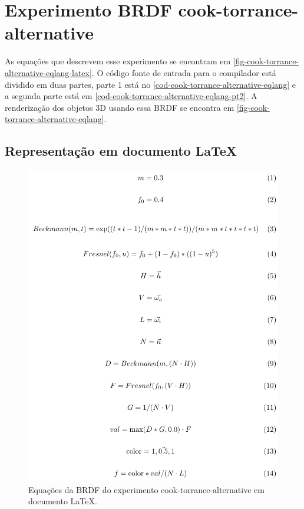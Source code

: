 \section{Experimento BRDF cook-torrance-alternative}

As equações que descrevem esse experimento se encontram em \autoref{fig-cook-torrance-alternative-eqlang-latex}. O código fonte de entrada para o compilador está dividido em duas partes, parte 1 está no \autoref{cod-cook-torrance-alternative-eqlang} e a segunda parte está em \autoref{cod-cook-torrance-alternative-eqlang-pt2}. A renderização dos objetos 3D usando essa BRDF se encontra em \autoref{fig-cook-torrance-alternative-eqlang}.

\subsection{Representação em documento \LaTeX{}}
\begin{figure}[H]
    \caption{\label{fig-cook-torrance-alternative-eqlang-latex} \small Equações da BRDF do experimento cook-torrance-alternative em documento \LaTeX{}.}
    \begin{center}
        \includegraphics[scale=0.92]{./Imagens/brdfs/cook-torrance-alternative.pdf}
    \end{center}
\end{figure}

